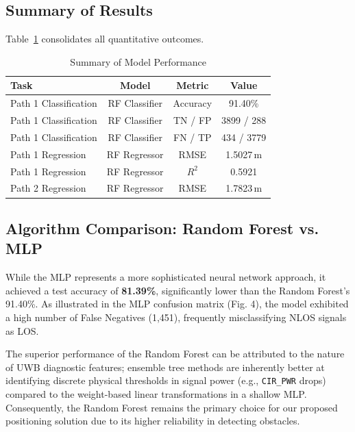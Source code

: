 \documentclass[conference]{IEEEtran}
\begin{document}
\subsection{Summary of Results}

Table~\ref{tab:results} consolidates all quantitative outcomes.

\begin{table}[htbp]
  \caption{Summary of Model Performance}
  \label{tab:results}
  \centering
  \begin{tabular}{lccc}
    \toprule
    \textbf{Task} & \textbf{Model} & \textbf{Metric} & \textbf{Value} \\
    \midrule
    Path 1 Classification & RF Classifier & Accuracy & 91.40\% \\
    Path 1 Classification & RF Classifier & TN / FP  & 3899 / 288 \\
    Path 1 Classification & RF Classifier & FN / TP  & 434 / 3779 \\
    \midrule
    Path 1 Regression     & RF Regressor  & RMSE     & 1.5027\,m \\
    Path 1 Regression     & RF Regressor  & $R^{2}$  & 0.5921 \\
    \midrule
    Path 2 Regression     & RF Regressor  & RMSE     & 1.7823\,m \\
    \bottomrule
  \end{tabular}
\end{table}

\subsection{Algorithm Comparison: Random Forest vs. MLP}
While the MLP represents a more sophisticated neural network approach, it achieved  a test accuracy of \textbf{81.39\%}, significantly lower than the Random Forest's 
91.40\%. As illustrated in the MLP confusion matrix (Fig. 4), the model exhibited 
a high number of False Negatives (1,451), frequently misclassifying NLOS signals 
as LOS. 

The superior performance of the Random Forest can be attributed to the nature of 
UWB diagnostic features; ensemble tree methods are inherently better at 
identifying discrete physical thresholds in signal power (e.g., \texttt{CIR\_PWR} 
drops) compared to the weight-based linear transformations in a shallow MLP. 
Consequently, the Random Forest remains the primary choice for our proposed 
positioning solution due to its higher reliability in detecting obstacles.
\end{document}
